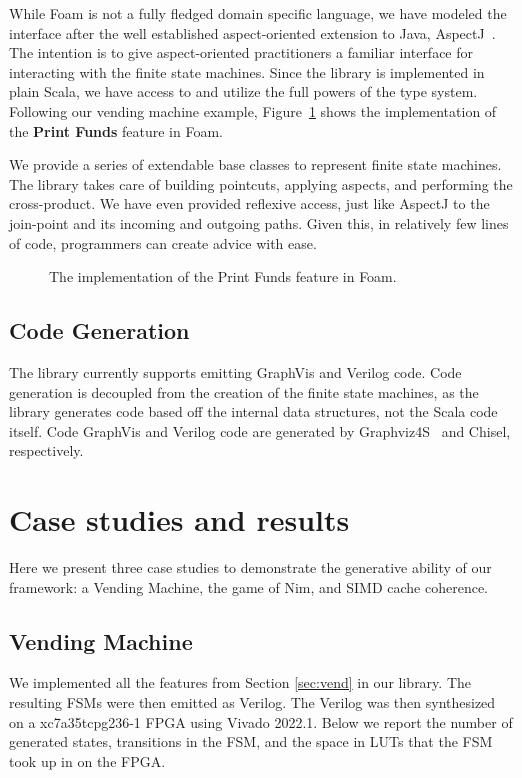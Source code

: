 \documentclass[sigplan,anonymous, review]{acmart}
\begin{document}
While Foam is not a fully fledged domain specific language, we have modeled the interface after the well established aspect-oriented extension to Java, AspectJ~\cite{aspectj}. The intention is to give aspect-oriented practitioners a familiar interface for interacting with the finite state machines. Since the library is implemented in plain Scala, we have access to and utilize the full powers of the type system. Following our vending machine example, Figure~\ref{lst:PrintFunds} shows the implementation of the \textbf{Print Funds} feature in Foam.

We provide a series of extendable base classes to represent finite state machines. The library takes care of building pointcuts, applying aspects, and performing the cross-product. We have even provided reflexive access, just like AspectJ to the join-point and its incoming and outgoing paths. Given this, in relatively few lines of code, programmers can create advice with ease.

\begin{figure}
    \centering
    
    \caption{The implementation of the Print Funds feature in Foam.}
    \label{lst:PrintFunds}
\end{figure}

\subsection{Code Generation}
The library currently supports emitting GraphVis and Verilog code. Code generation is decoupled from the creation of the finite state machines, as the library generates code based off the internal data structures, not the Scala code itself. Code GraphVis and Verilog code are generated by Graphviz4S~\cite{Ldpe2G:19} and Chisel, respectively. 

\section{Case studies and results}\label{sec:results}
Here we present three case studies to demonstrate the generative ability of our framework: a Vending Machine, the game of Nim, and SIMD cache coherence.

\subsection{Vending Machine}\label{sec:vendresults}
We implemented all the features from Section \ref{sec:vend} in our library. The resulting FSMs were then emitted as Verilog. The Verilog was then synthesized on a xc7a35tcpg236-1 FPGA using Vivado 2022.1. Below we report the number of generated states, transitions in the FSM, and the space in LUTs that the FSM took up in on the FPGA.
\end{document}
